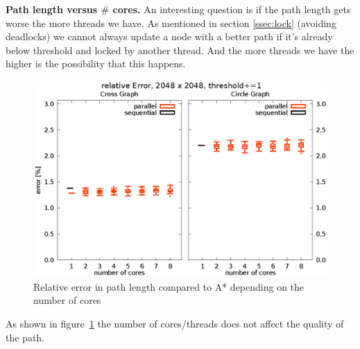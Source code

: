 \documentclass[letterpaper]{article}
\newcommand{\mypar}[1]{{\bf #1.}}
\begin{document}
\mypar{Path length versus $\#$ cores}
An interesting question is if the path length gets worse the more threads we have. As mentioned in section \ref{ssec:lock} (avoiding deadlocks) we cannot always update a node with a better path if it's already below threshold and locked by another thread. And the more threads we have the higher is the possibility that this happens.
\begin{figure}[h]\centering
  \includegraphics[scale=0.558]{error_cores.eps}
  \caption{Relative error in path length compared to A* depending on the number of cores\label{fig:error_cores}}
\end{figure}
As shown in figure~\ref{fig:error_cores} the number of cores/threads does not affect the quality of the path.
\end{document}
